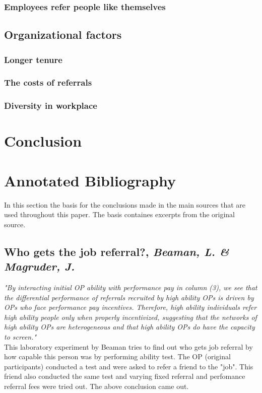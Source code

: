 \documentclass[a4paper, 11pt]{article} %
\begin{document}
\subsubsection*{Employees refer people like themselves}

\subsection*{Organizational factors}

\subsubsection*{Longer tenure}
\subsubsection*{The costs of referrals}
\subsubsection*{Diversity in workplace}

\section*{Conclusion}

\section*{Annotated Bibliography}
In this section the basis for the conclusions made in the main sources that are used throughout this paper. The basis containes excerpts from the original source.

\subsection*{Who gets the job referral?, \emph{Beaman, L. \& Magruder, J.} \cite{first}}

\emph{"By interacting initial OP ability with performance pay in column (3), we see that the differential
performance of referrals recruited by high ability OPs is driven by OPs who face performance
pay incentives. Therefore, high ability individuals refer high ability people only when properly
incentivized, suggesting that the networks of high ability OPs are heterogeneous and that high
ability OPs do have the capacity to screen."}\\

This laboratory experiment by Beaman tries to find out who gets job referral by how capable this person was by performing ability test. The OP (original participants) conducted a test and were asked to refer a friend to the "job". This friend also conducted the same test and varying fixed referral and perfomance referral fees were tried out. The above conclusion came out.
\end{document}
